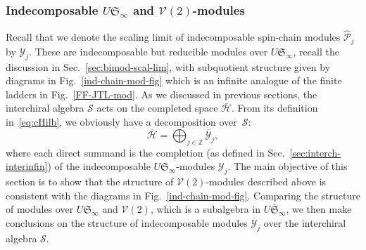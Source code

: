 \documentclass[11pt]{article}
\newcommand{\q}{\mathfrak{q}}
\newcommand{\JTL}[1]{JTL_{#1}}
\newcommand{\LQGodd}{U^{\text{odd}}_{\q} s\ell(2)}
\newcommand{\Hilb}{\mathcal{H}}
\newcommand{\cHilb}{\overline{\Hilb}}
\newcommand{\oZ}{\mathbb{Z}}
\newcommand{\VirN}{\boldsymbol{\mathcal{V}}}
\newcommand{\interLie}{\mathfrak{S}}
\newcommand{\interchalg}{\mathcal{S}}
\newcommand{\interinfin}{\interLie_{\infty}}
\newcommand{\interinfinco}{\overline{\interLie}_{\infty}}
\newcommand{\interP}[1]{\mathscr{Y}_{#1}}
\newcommand{\interPco}[1]{\overline{\mathscr{Y}}_{#1}}
\newcommand{\cent}{\mathfrak{Z}}
\newcommand{\centJTL}{\cent_{\JTL{}}}
\newcommand{\APrTL}[1]{\widehat{\mathscr{P}}_{#1}}
\theoremstyle{definition}
\begin{document}
\subsubsection{Indecomposable  $U\interinfin$ and $\VirN(2)$-modules}\label{sec:indecomp-Smod}
Recall that we denote the scaling limit of indecomposable
spin-chain modules $\APrTL{j}$ by $\interP{j}$. These are indecomposable but reducible modules over $U\interinfin$, recall the discussion in Sec.~\ref{sec:bimod-scal-lim}, with subquotient
structure given by diagrams in Fig.~\ref{ind-chain-mod-fig} which is an infinite analogue
of the finite ladders in Fig.~\ref{FF-JTL-mod}.
As we discussed in previous sections, the interchiral algebra $\interchalg$ acts on the completed space $\cHilb$. From its definition in~\eqref{eq:cHilb}, we obviously have a decomposition over~$\interchalg$:
\begin{equation}\label{eq:cHilb-decomp}
\cHilb=\bigoplus_{j\in\oZ} \interPco{j},
\end{equation}
where each direct summand is the completion (as defined in Sec.~\ref{sec:interch-interinfin}) of the indecomposable $U\interinfin$-modules  $\interP{j}$.
The main objective of this section is to show that the structure of $\VirN(2)$-modules
  described above is consistent with the diagrams in Fig.~\ref{ind-chain-mod-fig}.
Comparing the structure of modules over $U\interinfin$ and $\VirN(2)$, which is a subalgebra in $U\interinfinco$,  we then make conclusions on the structure of indecomposable modules $\interPco{j}$
over the interchiral algebra $\interchalg$.
\end{document}
